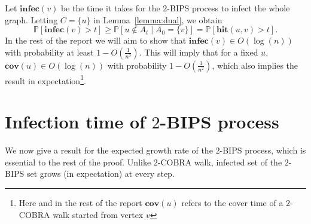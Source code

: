 \documentclass[11pt]{article}
\newcommand{\cov}{\mathbf{cov}}
\newcommand{\hit}{\mathbf{hit}}
\newcommand{\infec}{\mathbf{infec}}
\renewcommand{\Pr}{\mathbb P}
\theoremstyle{remark}
\begin{document}
Let $\infec(v)$ be the time it takes for the $2$-BIPS process to infect the whole graph. Letting $C = \{u\}$ in Lemma~\ref{lemma:dual}, we obtain \begin{equation}
\label{eq:infec}
\Pr[\infec(v) > t] \ge \Pr\left[u \not\in A_t \mid A_0 = \{v\} \right] = \Pr\left[\hit(u,v) > t \right].
\end{equation}
In the rest of the report we will aim to show that $\infec(v) \in O(\log(n))$ with probability at least $1 - O\left(\frac{1}{n^3}\right)$. This will imply that for a fixed $u$, $\cov(u) \in O(\log(n))$ with probability $1 - O\left(\frac{1}{n^2}\right)$, which also implies the result in expectation\footnote{Here and in the rest of the report $\cov(u)$ refers to the cover time of a $2$-COBRA walk started from vertex $v$}.

\section{Infection time of $2$-BIPS process}

We now give a result for the expected growth rate of the $2$-BIPS process, which is essential to the rest of the proof. Unlike $2$-COBRA walk, infected set of the $2$-BIPS set grows (in expectation) at every step. 
\end{document}
